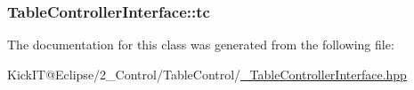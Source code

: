 \subsubsection[{\texorpdfstring{tc}{tc}}]{ Table\+Controller\+Interface\+::tc\hspace{0.3cm}{\ttfamily [protected]}}\hypertarget{class_table_controller_interface_a112a9a0793cc792d806e9a9a233f4660}{}\label{class_table_controller_interface_a112a9a0793cc792d806e9a9a233f4660}


The documentation for this class was generated from the following file\+:\begin{DoxyCompactItemize}
\item 
Kick\+I\+T@\+Eclipse/2\+\_\+\+Control/\+Table\+Control/\hyperlink{___table_controller_interface_8hpp}{\+\_\+\+Table\+Controller\+Interface.\+hpp}\end{DoxyCompactItemize}
